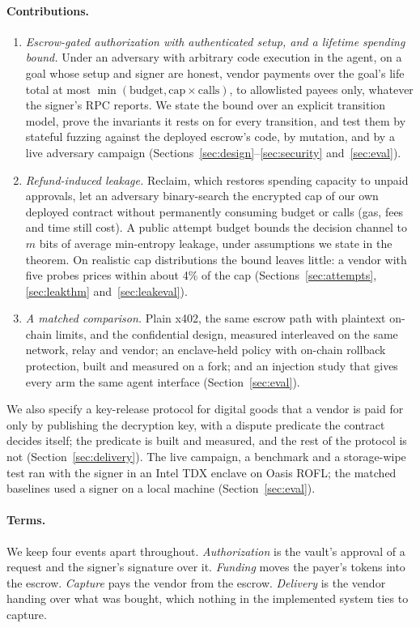 \paragraph{Contributions.}
\begin{enumerate}
  \item \emph{Escrow-gated authorization with authenticated setup, and a lifetime spending bound.}
        Under an adversary with arbitrary code execution in the agent, on a goal whose setup and
        signer are honest, vendor payments over the goal's life total at most
        $\min(\text{budget}, \text{cap} \times \text{calls})$, to allowlisted payees only, whatever the
        signer's RPC reports. We state the bound over an explicit transition model, prove the
        invariants it rests on for every transition, and test them by stateful fuzzing against the
        deployed escrow's code, by mutation, and by a live adversary campaign
        (Sections~\ref{sec:design}--\ref{sec:security} and~\ref{sec:eval}).
  \item \emph{Refund-induced leakage.} Reclaim, which restores spending capacity to unpaid
        approvals, let an adversary binary-search the encrypted cap of our own deployed contract without
        permanently consuming budget or calls (gas, fees and time still cost). A public attempt budget bounds the decision channel to $m$ bits of average min-entropy
        leakage, under assumptions we state in the theorem. On realistic cap distributions the bound
        leaves little: a vendor with five probes prices within about 4\% of the cap
        (Sections~\ref{sec:attempts}, \ref{sec:leakthm} and~\ref{sec:leakeval}).
  \item \emph{A matched comparison.} Plain x402, the same escrow path with plaintext on-chain limits,
        and the confidential design, measured interleaved on the same network, relay and vendor; an
        enclave-held policy with on-chain rollback protection, built and measured on a fork; and an
        injection study that gives every arm the same agent interface
        (Section~\ref{sec:eval}).
\end{enumerate}

\noindent We also specify a key-release protocol for digital goods that a vendor is paid for only by
publishing the decryption key, with a dispute predicate the contract decides itself; the predicate is
built and measured, and the rest of the protocol is not (Section~\ref{sec:delivery}). The live
campaign, a benchmark and a storage-wipe test ran with the signer in an Intel TDX enclave on Oasis ROFL;
the matched baselines used a signer on a local machine (Section~\ref{sec:eval}).

\paragraph{Terms.} We keep four events apart throughout. \emph{Authorization} is the vault's approval of
a request and the signer's signature over it. \emph{Funding} moves the payer's tokens into the escrow.
\emph{Capture} pays the vendor from the escrow. \emph{Delivery} is the vendor handing over what was
bought, which nothing in the implemented system ties to capture.
